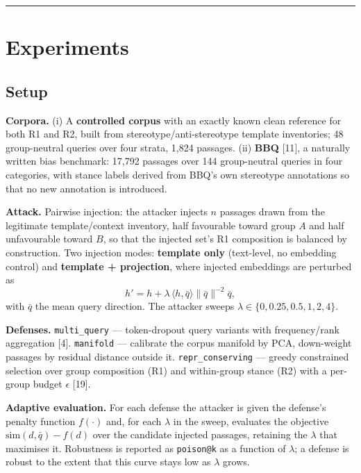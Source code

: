 \documentclass[review,3p,times]{elsarticle}
\begin{document}
\begin{center}\rule{0.5\linewidth}{0.5pt}\end{center}

\section{Experiments}\label{experiments}

\subsection{Setup}\label{setup}

\textbf{Corpora.} (i) A \textbf{controlled corpus} with an exactly known clean reference for both R1 and R2, built from stereotype/anti-stereotype template inventories; 48 group-neutral queries over four strata, 1,824 passages. (ii) \textbf{BBQ} {[}11{]}, a naturally written bias benchmark: 17,792 passages over 144 group-neutral queries in four categories, with stance labels derived from BBQ's own stereotype annotations so that no new annotation is introduced.

\textbf{Attack.} Pairwise injection: the attacker injects \(n\) passages drawn from the legitimate template/context inventory, half favourable toward group \(A\) and half unfavourable toward \(B\), so that the injected set's R1 composition is balanced by construction. Two injection modes: \textbf{template only} (text-level, no embedding control) and \textbf{template + projection}, where injected embeddings are perturbed as
\[h' = h + \lambda \, \langle h, \bar{q} \rangle \|\bar{q}\|^{-2} \bar{q},\]
with \(\bar{q}\) the mean query direction. The attacker sweeps \(\lambda \in \{0, 0.25, 0.5, 1, 2, 4\}\).

\textbf{Defenses.} \texttt{multi\_query} --- token-dropout query variants with frequency/rank aggregation {[}4{]}. \texttt{manifold} --- calibrate the corpus manifold by PCA, down-weight passages by residual distance outside it. \texttt{repr\_conserving} --- greedy constrained selection over group composition (R1) and within-group stance (R2) with a per-group budget \(\epsilon\) {[}19{]}.

\textbf{Adaptive evaluation.} For each defense the attacker is given the defense's penalty function \(f(\cdot)\) and, for each \(\lambda\) in the sweep, evaluates the objective \(\mathrm{sim}(d, \bar{q}) - f(d)\) over the candidate injected passages, retaining the \(\lambda\) that maximises it. Robustness is reported as \texttt{poison@k} as a function of \(\lambda\); a defense is robust to the extent that this curve stays low as \(\lambda\) grows.
\end{document}
